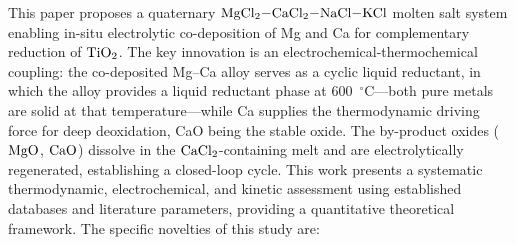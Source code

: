 \documentclass[pdflatex,sn-basic,Numbered]{sn-jnl}
\begin{document}
This paper proposes a quaternary $\ce{MgCl2-CaCl2-NaCl-KCl}$ molten salt system enabling in-situ electrolytic co-deposition of Mg and Ca for complementary reduction of $\ce{TiO2}$. The key innovation is an electrochemical-thermochemical coupling: the co-deposited Mg--Ca alloy serves as a cyclic liquid reductant, in which the alloy provides a liquid reductant phase at 600~$^{\circ}$C---both pure metals are solid at that temperature---while Ca supplies the thermodynamic driving force for deep deoxidation, CaO being the stable oxide. The by-product oxides ($\ce{MgO}$, $\ce{CaO}$) dissolve in the $\ce{CaCl2}$-containing melt and are electrolytically regenerated, establishing a closed-loop cycle. This work presents a systematic thermodynamic, electrochemical, and kinetic assessment using established databases \cite{barin1995,waldner1999} and literature parameters, providing a quantitative theoretical framework. The specific novelties of this study are:
\end{document}
